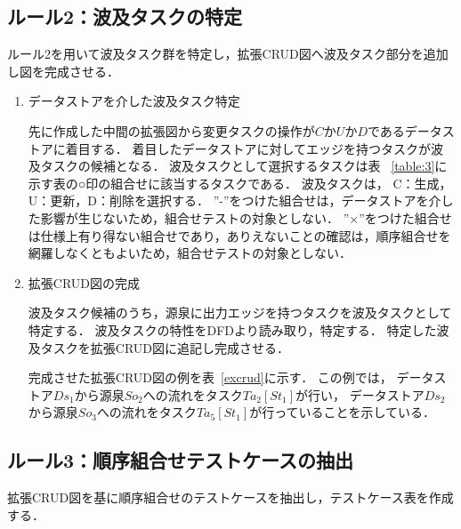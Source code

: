\documentclass[a4paper,12pt]{jreport}
\begin{document}
\subsection{ルール2：波及タスクの特定}
ルール2を用いて波及タスク群を特定し，拡張CRUD図へ波及タスク部分を追加し図を完成させる．

\begin{enumerate}
\item データストアを介した波及タスク特定

先に作成した中間の拡張図から変更タスクの操作が$C$か$U$か$D$であるデータストアに着目する．
着目したデータストアに対してエッジを持つタスクが波及タスクの候補となる．
波及タスクとして選択するタスクは表 ~\ref{table:3}に示す表の○印の組合せに該当するタスクである．
波及タスクは， C：生成，U：更新，D：削除を選択する．
”-”をつけた組合せは，データストアを介した影響が生じないため，組合せテストの対象としない．
”×”をつけた組合せは仕様上有り得ない組合せであり，ありえないことの確認は，順序組合せを網羅しなくともよいため，組合せテストの対象としない．


\item 拡張CRUD図の完成

波及タスク候補のうち，源泉に出力エッジを持つタスクを波及タスクとして特定する．
波及タスクの特性をDFDより読み取り，特定する．
特定した波及タスクを拡張CRUD図に追記し完成させる．

完成させた拡張CRUD図の例を表~\ref{excrud}に示す．
この例では，
データストア$Ds_1$から源泉$So_2$への流れをタスク$Ta_2[St_1]$が行い，
データストア$Ds_2$から源泉$So_3$への流れをタスク$Ta_5[St_1]$が行っていることを示している．

\end{enumerate}

\subsection{ルール3：順序組合せテストケースの抽出}
拡張CRUD図を基に順序組合せのテストケースを抽出し，テストケース表を作成する．
\end{document}
